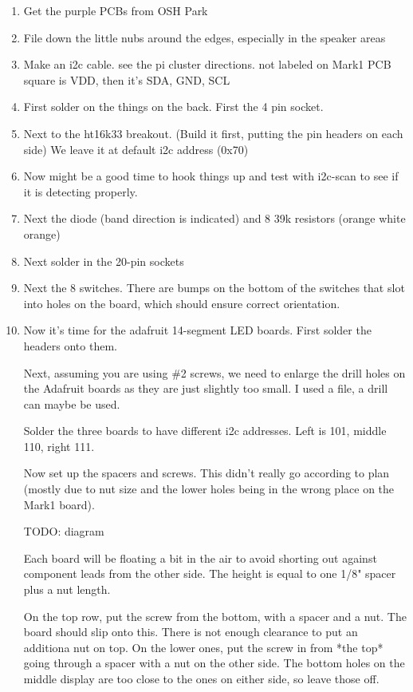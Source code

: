 \documentclass[11pt]{article}
\begin{document}
\begin{enumerate}
\item	Get the purple PCBs from OSH Park
\item	File down the little nubs around the edges, especially in the speaker
	areas
\item	Make an i2c cable.  see the pi cluster directions.
	not labeled on Mark1 PCB
	square is VDD, then it's SDA, GND, SCL

\item	First solder on the things on the back.  First the 4 pin socket.

\item	Next to the ht16k33 breakout.  (Build it first, putting the pin
	headers on each side)  We leave it at default i2c address (0x70)

\item	Now might be a good time to hook things up and test with i2c-scan
	to see if it is detecting properly.

\item	Next the diode (band direction is indicated)
	and 8 39k  resistors (orange white orange)

\item	Next solder in the 20-pin sockets

\item	Next the 8 switches.  There are bumps on the bottom of the
	switches that slot into holes on the board, which should
	ensure correct orientation.

\item	Now it's time for the adafruit 14-segment LED boards.
	First solder the headers onto them.

	Next, assuming you are using \#2 screws, we need to enlarge the
	drill holes on the Adafruit boards as they are just slightly too
	small.  I used a file, a drill can maybe be used.

	Solder the three boards to have different i2c addresses.
	Left is 101, middle 110, right 111.

	Now set up the spacers and screws.  This didn't really go according
	to plan (mostly due to nut size and the lower holes being in the
	wrong place on the Mark1 board).

	TODO: diagram

	Each board will be floating a bit in the air to avoid shorting out
	against component leads from the other side.  The height is equal
	to one 1/8" spacer plus a nut length.  

	On the top row, put the screw from the bottom, with a spacer and a nut.
	The board should slip onto this.  There is not enough clearance
	to put an additiona nut on top.
	On the lower ones, put the screw in from *the top* going through 
	a spacer with a nut on the other side.
	The bottom holes on the middle display are too close to the ones
	on either side, so leave those off.


\end{enumerate}
\end{document}
